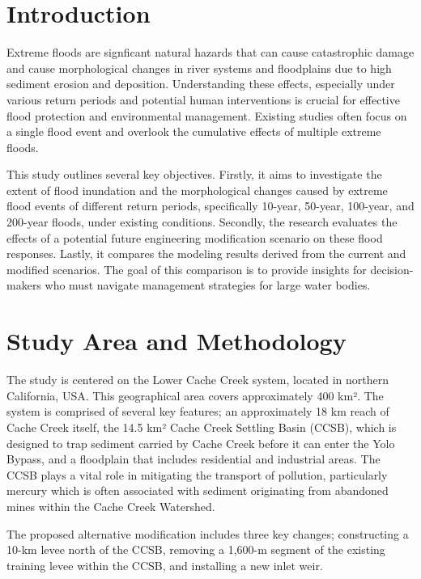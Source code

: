 \documentclass[a4paper, 11pt]{article}
\begin{document}
\section{Introduction}

\hspace*{0.5cm}Extreme floods are signficant natural hazards that can cause catastrophic damage and cause morphological changes in river systems and floodplains due to high sediment erosion and deposition. Understanding these effects, especially under various return periods and potential human interventions is crucial for effective flood protection and environmental management. Existing studies often focus on a single flood event and overlook the cumulative effects of multiple extreme floods. 

This study outlines several key objectives. Firstly, it aims to investigate the extent of flood inundation and the morphological changes caused by extreme flood events of different return periods, specifically 10-year, 50-year, 100-year, and 200-year floods, under existing conditions. Secondly, the research evaluates the effects of a potential future engineering modification scenario on these flood responses. Lastly, it compares the modeling results derived from the current and modified scenarios. The goal of this comparison is to provide insights for decision-makers who must navigate management strategies for large water bodies.

\section{Study Area and Methodology}
\hspace*{0.5cm}The study is centered on the Lower Cache Creek system, located in northern California, USA. This geographical area covers approximately 400 km². The system is comprised of several key features; an approximately 18 km reach of Cache Creek itself, the 14.5 km² Cache Creek Settling Basin (CCSB), which is designed to trap sediment carried by Cache Creek before it can enter the Yolo Bypass, and a floodplain that includes residential and industrial areas. The CCSB plays a vital role in mitigating the transport of pollution, particularly mercury which is often associated with sediment originating from abandoned mines within the Cache Creek Watershed.

The proposed alternative modification includes three key changes; constructing a 10-km levee north of the CCSB, removing a 1,600-m segment of the existing training levee within the CCSB, and installing a new inlet weir.
\end{document}
